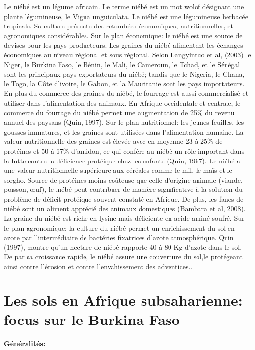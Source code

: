 \documentclass[a4paper,11pt]{article}
\begin{document}
Le niébé est un légume africain. Le terme niébé est un mot wolof
désignant une plante légumineuse, le Vigna unguiculata. Le niébé est
une légumineuse herbacée tropicale. Sa culture présente des retombées
économiques, nutritionnelles, et agronomiques considérables. Sur le
plan économique: le niébé est une source de devises pour les pays
producteurs. Les graines du niébé alimentent les échanges économiques
au niveau régional et sous régional. Selon Langyintuo et al, (2003) le
Niger, le Burkina Faso, le Bénin, le Mali, le Cameroun, le Tchad, et
le Sénégal sont les principaux pays exportateurs du niébé; tandis que
le Nigeria, le Ghana, le Togo, la Côte d’ivoire, le Gabon, et la
Mauritanie sont les pays importateurs. En plus du commerce des graines
du niébé, le fourrage est aussi commercialisé et utiliser dans
l’alimentation des animaux. En Afrique occidentale et centrale, le
commerce du fourrage du niébé permet une augmentation de 25\% du
revenu annuel des paysans (Quin, 1997). Sur le plan nutritionnel: les
jeunes feuilles, les gousses immatures, et les graines sont utilisées
dans l’alimentation humaine. La valeur nutritionnelle des graines est
élevée avec en moyenne 23 à 25\% de protéines et 50 à 67\% d’amidon,
ce qui confère au niébé un rôle important dans la lutte contre la
déficience protéique chez les enfants (Quin, 1997). Le niébé a une
valeur nutritionnelle supérieure aux céréales comme le mil, le maïs et
le sorgho. Source de protéines moins coûteuse que celle d’origine
animale (viande, poisson, œuf), le niébé peut contribuer de manière
significative à la solution du problème de déficit protéique souvent
constaté en Afrique. De plus, les fanes de niébé sont un aliment
apprécié des animaux domestiques (Bambara et al, 2008). La graine du
niébé est riche en lysine mais déficiente en acide aminé soufré. Sur
le plan agronomique: la culture du niébé permet un enrichissement du
sol en azote par l’intermédiaire de bactéries fixatrices d’azote
atmosphérique. Quin (1997), montre qu’un hectare de niébé rapporte
 40 à 80 Kg d’azote dans le sol. De par sa croissance rapide, le niébé
assure une couverture du sol,le protégeant ainsi contre l’érosion et
contre l’envahissement des adventices.\cite{Doggett_1988}.

\section{Les sols en Afrique subsaharienne: focus sur le Burkina Faso}

\paragraph{Généralités:}
\end{document}
